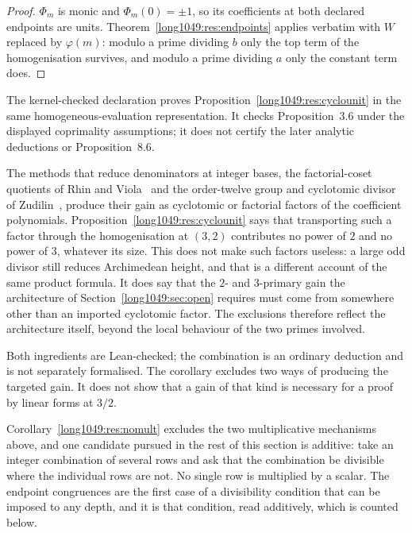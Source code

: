 \documentclass[11pt]{article}
\begin{document}
\begin{proof}
$\Phi_m$ is monic and $\Phi_m(0)=\pm1$, so its coefficients at both declared
endpoints are units.  Theorem~\ref{long1049:res:endpoints} applies verbatim with $W$
replaced by $\varphi(m)$: modulo a prime dividing $b$ only the top term of the
homogenisation survives, and modulo a prime dividing $a$ only the constant term
does.
\end{proof}

The kernel-checked declaration
proves Proposition~\ref{long1049:res:cyclounit} in the same homogeneous-evaluation
representation.  It checks Proposition~3.6 under the displayed coprimality
assumptions; it does not certify the later analytic deductions or
Proposition~8.6.

The methods that reduce denominators at integer bases, the factorial-coset
quotients of Rhin and Viola~\cite{rhinviola1996} and the order-twelve group and
cyclotomic divisor of Zudilin~\cite{zudilin2004}, produce their gain as
cyclotomic or factorial factors of the coefficient polynomials.
Proposition~\ref{long1049:res:cyclounit} says that transporting such a factor through the
homogenisation at $(3,2)$ contributes no power of $2$ and no power of $3$,
whatever its size.  This does not make such factors useless: a large odd
divisor still reduces Archimedean height, and that is a different account of the
same product formula.  It does say that the $2$- and $3$-primary gain the
architecture of Section~\ref{long1049:sec:open} requires must come from somewhere other
than an imported cyclotomic factor.  The exclusions therefore reflect the
architecture itself, beyond the local behaviour of the two primes involved.

\noindent Both ingredients are Lean-checked; the combination is an ordinary
deduction and is not separately formalised.  The corollary excludes two ways of
producing the targeted gain.  It does not show that a gain of that kind is
necessary for a proof by linear forms at \(3/2\).

Corollary~\ref{long1049:res:nomult} excludes the two multiplicative mechanisms above,
and one candidate pursued in the rest of this section is additive: take an
integer combination of several rows and ask that the combination be divisible
where the individual rows are not.  No single row is multiplied by a scalar.  The endpoint
congruences are the first case of a divisibility condition that can be imposed
to any depth, and it is that condition, read additively, which is counted
below.
\end{document}

